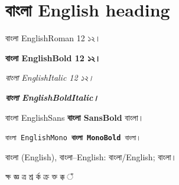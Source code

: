 \section{বাংলা English heading}
বাংলা EnglishRoman 12 ১২।\par
\textbf{বাংলা EnglishBold 12 ১২।}\par
\textit{বাংলা EnglishItalic 12 ১২।}\par
\textbf{\textit{বাংলা EnglishBoldItalic।}}\par
\textsf{বাংলা EnglishSans \textbf{বাংলা SansBold} বাংলা।}\par
\texttt{বাংলা EnglishMono \textbf{বাংলা MonoBold} বাংলা।}\par
বাংলা (English), বাংলা--English: বাংলা/English; বাংলা।\par
ক্ষ জ্ঞ ত্র শ্র র্ক ক্র ক্ত ক্ক ঁ\par
